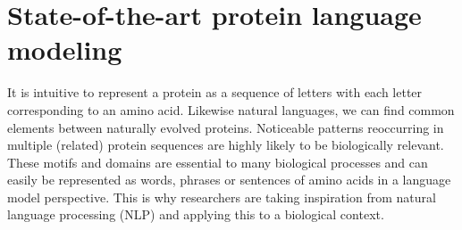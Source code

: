 \section{State-of-the-art protein language modeling}
It is intuitive to represent a protein as a sequence of letters with each letter corresponding to an amino acid. Likewise natural languages, we can find common elements between naturally evolved proteins. Noticeable patterns reoccurring in multiple (related) protein sequences are highly likely to be biologically relevant. These motifs and domains are essential to many biological processes and can easily be represented as words, phrases or sentences of amino acids in a language model perspective. This is why researchers are taking inspiration from natural language processing (NLP) and applying this to a biological context. 